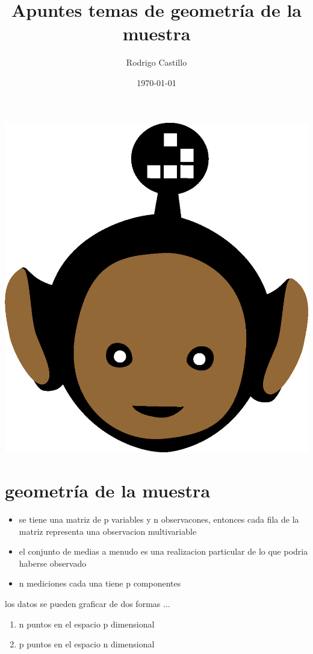 \documentclass[10pt,a4paper]{article} %
\begin{document}
    \title{{  Apuntes temas de geometría de la muestra  }}
    \author{{Rodrigo Castillo}}
    \date{\today}

    \maketitle


    \includegraphics[width=0.1\linewidth]{negro_cara.png}

    \section{geometría de la muestra}
        \begin{itemize}
            \item {se tiene una matriz de p variables y n observacones, entonces
                cada fila de la matriz representa una observacion multivariable}
            \item {el conjunto de medias a menudo es una realizacion particular de
                lo que podria haberse observado}
            \item {n mediciones cada una tiene p componentes}
        \end{itemize}

        los datos se pueden graficar de dos formas ...

        \begin{enumerate}
            \item {n puntos en el espacio p dimensional}
            \item {p puntos en el espacio n dimensional}
        \end{enumerate}
\end{document}
